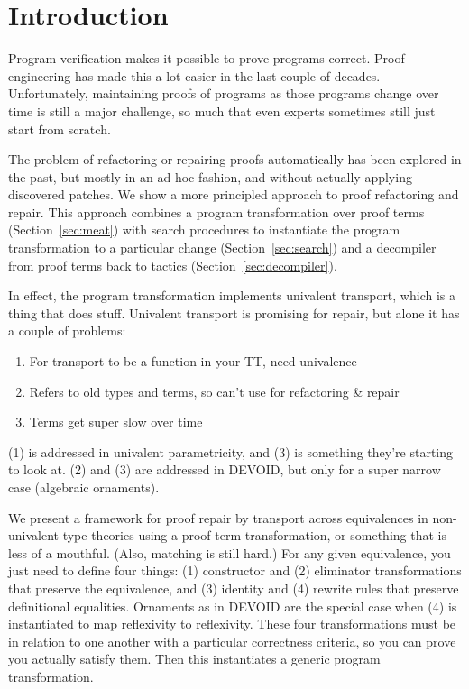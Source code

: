 \section{Introduction}

Program verification makes it possible to prove programs correct.
Proof engineering has made this a lot easier in the last couple of decades.
Unfortunately, maintaining proofs of programs as those programs change over
time is still a major challenge,
so much that even experts sometimes still just start from scratch.

The problem of refactoring or repairing proofs automatically has been explored in the past,
but mostly in an ad-hoc fashion, and without actually applying discovered patches.
We show a more principled approach to proof refactoring and repair.
This approach combines a program transformation over proof terms (Section~\ref{sec:meat})
with search procedures to instantiate the program transformation to a particular change (Section~\ref{sec:search})
and a decompiler from proof terms back to tactics (Section~\ref{sec:decompiler}).

In effect, the program transformation implements univalent transport, which is a thing that does stuff.
Univalent transport is promising for repair, but alone it has a couple of problems:

\begin{enumerate}
  \item For transport to be a function in your TT, need univalence
  \item Refers to old types and terms, so can't use for refactoring \& repair
  \item Terms get super slow over time
\end{enumerate}
(1) is addressed in univalent parametricity, and (3) is something they're starting to look at. (2) and (3) are addressed in DEVOID,
but only for a super narrow case (algebraic ornaments).

We present a framework for proof repair by transport across equivalences in non-univalent type theories using a proof term transformation,
or something that is less of a mouthful. (Also, matching is still hard.)
For any given equivalence, you just need to define four things: (1) constructor and (2) eliminator transformations that preserve the equivalence, and (3) identity and (4) rewrite rules that preserve definitional equalities.
Ornaments as in DEVOID are the special case when (4) is instantiated to map reflexivity to reflexivity.
These four transformations must be in relation to one another with a particular correctness criteria, so you can
prove you actually satisfy them. Then this instantiates a generic program transformation.

